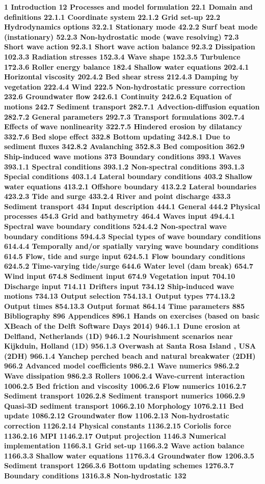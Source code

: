\documentclass{article}
\begin{document}
\noindent \textbf{1 Introduction 12 Processes and model formulation 22.1 Domain and definitions 22.1.1 Coordinate system 22.1.2 Grid set-up 22.2 Hydrodynamics options 32.2.1 Stationary mode 42.2.2 Surf beat mode (instationary) 52.2.3 Non-hydrostatic mode (wave resolving) 72.3 Short wave action 92.3.1 Short wave action balance 92.3.2 Dissipation 102.3.3 Radiation stresses 152.3.4 Wave shape 152.3.5 Turbulence 172.3.6 Roller energy balance 182.4 Shallow water equations 202.4.1 Horizontal viscosity 202.4.2 Bed shear stress 212.4.3 Damping by vegetation 222.4.4 Wind 222.5 Non-hydrostatic pressure correction 232.6 Groundwater flow 242.6.1 Continuity 242.6.2 Equation of motions 242.7 Sediment transport 282.7.1 Advection-diffusion equation 282.7.2 General parameters 292.7.3 Transport formulations 302.7.4 Effects of wave nonlinearity 322.7.5 Hindered erosion by dilatancy 332.7.6 Bed slope effect 332.8 Bottom updating 342.8.1 Due to sediment fluxes 342.8.2 Avalanching 352.8.3 Bed composition 362.9 Ship-induced wave motions 373 Boundary conditions 393.1 Waves 393.1.1 Spectral conditions 393.1.2 Non-spectral conditions 393.1.3 Special conditions 403.1.4 Lateral boundary conditions 403.2 Shallow water equations 413.2.1 Offshore boundary 413.2.2 Lateral boundaries 423.2.3 Tide and surge 433.2.4 River and point discharge 433.3 Sediment transport 434 Input description 444.1 General 444.2 Physical processes 454.3 Grid and bathymetry 464.4 Waves input 494.4.1 Spectral wave boundary conditions 524.4.2 Non-spectral wave boundary conditions 594.4.3 Special types of wave boundary conditions 614.4.4 Temporally and/or spatially varying wave boundary conditions 614.5 Flow, tide and surge input 624.5.1 Flow boundary conditions 624.5.2 Time-varying tide/surge 644.6 Water level (dam break) 654.7 Wind input 674.8 Sediment input 674.9 Vegetation input 704.10 Discharge input 714.11 Drifters input 734.12 Ship-induced wave motions 734.13 Output selection 754.13.1 Output types 774.13.2 Output times 854.13.3 Output format 864.14 Time parameters 885 Bibliography 896 Appendices 896.1 Hands on exercises (based on basic XBeach of the Delft Software Days 2014) 946.1.1 Dune erosion at Delfland, Netherlands (1D) 946.1.2 Nourishment scenarios near Kijkduin, Holland (1D) 956.1.3 Overwash at Santa Rosa Island , USA (2DH) 966.1.4 Yanchep perched beach and natural breakwater (2DH) 966.2 Advanced model coefficients 986.2.1 Wave numerics 986.2.2 Wave dissipation 986.2.3 Rollers 1006.2.4 Wave-current interaction 1006.2.5 Bed friction and viscosity 1006.2.6 Flow numerics 1016.2.7 Sediment transport 1026.2.8 Sediment transport numerics 1066.2.9 Quasi-3D sediment transport 1066.2.10 Morphology 1076.2.11 Bed update 1086.2.12 Groundwater flow 1106.2.13 Non-hydrostatic correction 1126.2.14 Physical constants 1136.2.15 Coriolis force 1136.2.16 MPI  1146.2.17 Output projection 1146.3 Numerical implementation 1166.3.1 Grid set-up 1166.3.2 Wave action balance 1166.3.3 Shallow water equations 1176.3.4 Groundwater flow 1206.3.5 Sediment transport 1266.3.6 Bottom updating schemes 1276.3.7 Boundary conditions 1316.3.8 Non-hydrostatic 132}
\end{document}
